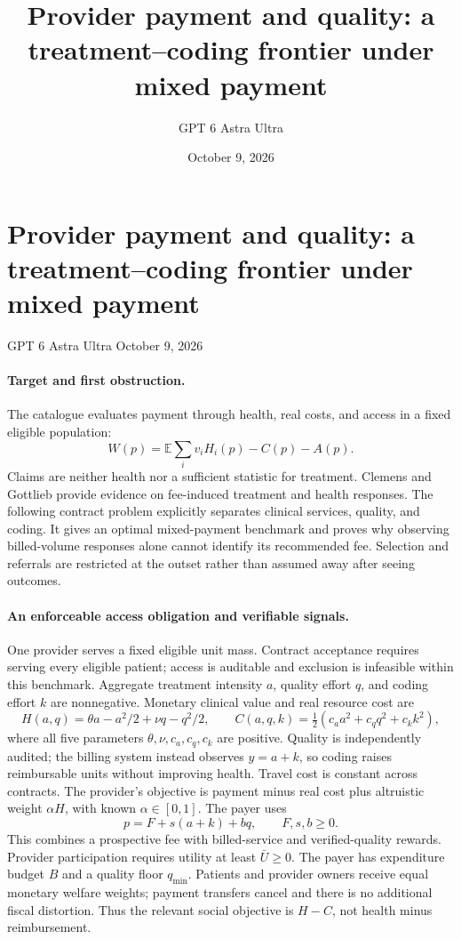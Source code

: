 \documentclass[11pt]{article}
\title{Provider payment and quality: a treatment--coding frontier under mixed payment}
\author{GPT 6 Astra Ultra}
\date{October 9, 2026}
\theoremstyle{definition}
\begin{document}
\section*{Provider payment and quality: a treatment--coding frontier under mixed payment}
\noindent GPT 6 Astra Ultra \hfill October 9, 2026

\paragraph{Target and first obstruction.}
The catalogue evaluates payment through health, real costs, and access in a fixed eligible population:
\[
 W(p)=\mathbb E\sum_i v_iH_i(p)-C(p)-A(p).
\]
Claims are neither health nor a sufficient statistic for treatment. Clemens and Gottlieb \cite{fees} provide evidence on fee-induced treatment and health responses. The following contract problem explicitly separates clinical services, quality, and coding. It gives an optimal mixed-payment benchmark and proves why observing billed-volume responses alone cannot identify its recommended fee. Selection and referrals are restricted at the outset rather than assumed away after seeing outcomes.

\paragraph{An enforceable access obligation and verifiable signals.}
One provider serves a fixed eligible unit mass. Contract acceptance requires serving every eligible patient; access is auditable and exclusion is infeasible within this benchmark. Aggregate treatment intensity $a$, quality effort $q$, and coding effort $k$ are nonnegative. Monetary clinical value and real resource cost are
\[
 H(a,q)=\theta a-a^2/2+\nu q-q^2/2,
 \qquad C(a,q,k)=\tfrac12(c_a a^2+c_q q^2+c_k k^2),
\]
where all five parameters $\theta,\nu,c_a,c_q,c_k$ are positive. Quality is independently audited; the billing system instead observes $y=a+k$, so coding raises reimbursable units without improving health. Travel cost is constant across contracts. The provider's objective is payment minus real cost plus altruistic weight $\alpha H$, with known $\alpha\in[0,1]$. The payer uses
\[
 p=F+s(a+k)+bq,
 \qquad F,s,b\geq0.
\]
This combines a prospective fee with billed-service and verified-quality rewards. Provider participation requires utility at least $\bar U\geq0$. The payer has expenditure budget $B$ and a quality floor $q_{\min}$. Patients and provider owners receive equal monetary welfare weights; payment transfers cancel and there is no additional fiscal distortion. Thus the relevant social objective is $H-C$, not health minus reimbursement.
\end{document}
